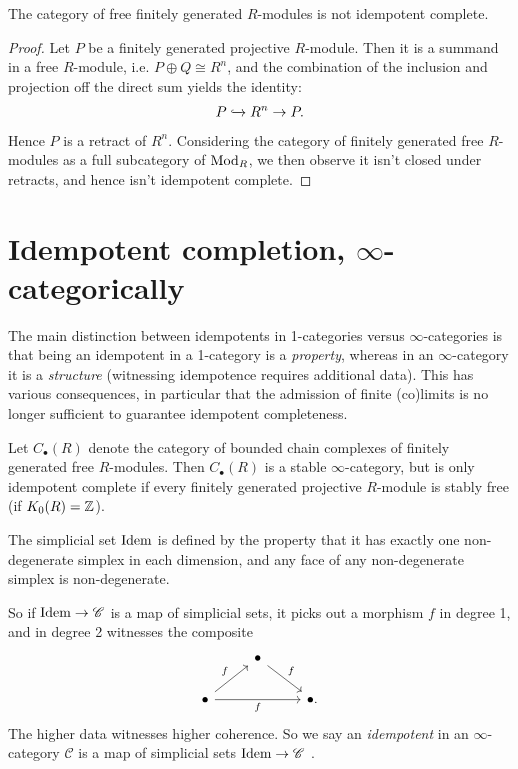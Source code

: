 \begin{example} The category of free finitely generated $R$-modules is not idempotent complete.
\end{example}
\begin{proof} Let $P$ be a finitely generated projective $R$-module. Then it is a summand in a free $R$-module, i.e. $P \oplus Q \cong R^n$, and the combination of the inclusion and projection off the direct sum yields the identity:
\begin{align*}
    P \xhookrightarrow{} R^n \to P.
\end{align*}
Hence $P$ is a retract of $R^n$. Considering the category of finitely generated free $R$-modules as a full subcategory of $\mathrm{Mod}_R$, we then observe it isn't closed under retracts, and hence isn't idempotent complete.
\end{proof}


\section{Idempotent completion, \texorpdfstring{$\infty$}{infty}-categorically}

The main distinction between idempotents in 1-categories versus $\infty$-categories is that being an idempotent in a 1-category is a \textit{property}, whereas in an $\infty$-category it is a \textit{structure} (witnessing idempotence requires additional data). This has various consequences, in particular that the admission of finite (co)limits is no longer sufficient to guarantee idempotent completeness.

\begin{example} \cite[4.4.5.1]{HTT} Let $C_\bullet(R)$ denote the category of bounded chain complexes of finitely generated free $R$-modules. Then $C_\bullet(R)$ is a stable $\infty$-category, but is only idempotent complete if every finitely generated projective $R$-module is stably free (if $K_0(R) = \mathbb{Z}$).
\end{example}

\begin{definition} \cite[4.4.5.3]{HTT} The simplicial set $\mathrm{Idem}$ is defined by the property that it has exactly one non-degenerate simplex in each dimension, and any face of any non-degenerate simplex is non-degenerate.
\end{definition}

So if $\mathrm{Idem} \to \mathscr{C}$ is a map of simplicial sets, it picks out a morphism $f$ in degree 1, and in degree 2 witnesses the composite
\[ \begin{tikzcd}
     & \bullet\ar[dr,"f" above right] & \\
    \bullet\ar[rr,"f" below]\ar[ur,"f" above left] &  & \bullet.
\end{tikzcd} \]
The higher data witnesses higher coherence. So we say an \textit{idempotent} in an $\infty$-category $\mathscr{C}$ is a map of simplicial sets $\mathrm{Idem} \to \mathscr{C}$ \cite[4.4.5.4]{HTT}.

